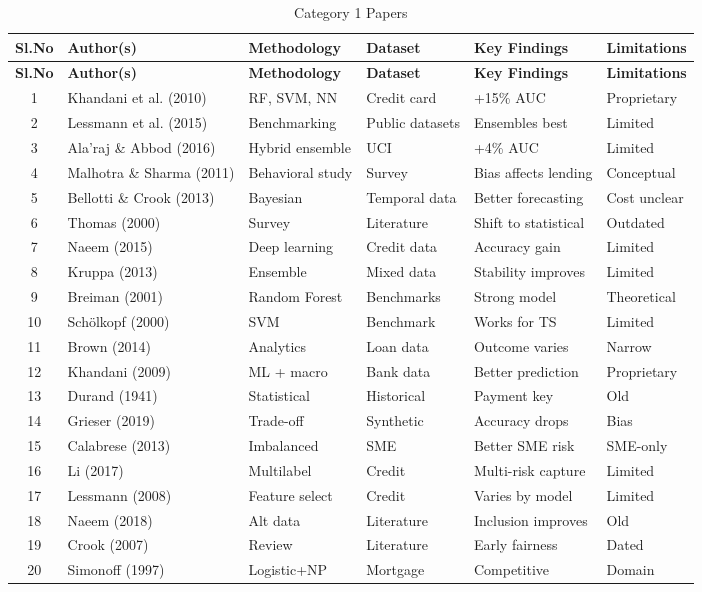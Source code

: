 \begin{longtable}{c p{} p{} p{} p{} p{}}
\caption{Category 1 Papers} \\
\toprule
\textbf{Sl.No} & \textbf{Author(s)} & \textbf{Methodology} & \textbf{Dataset} & \textbf{Key Findings} & \textbf{Limitations} \\
\midrule
\endfirsthead
\toprule
\textbf{Sl.No} & \textbf{Author(s)} & \textbf{Methodology} & \textbf{Dataset} & \textbf{Key Findings} & \textbf{Limitations} \\
\midrule
\endhead

1 & Khandani et al. (2010) & RF, SVM, NN & Credit card & +15\% AUC & Proprietary \\
2 & Lessmann et al. (2015) & Benchmarking & Public datasets & Ensembles best & Limited \\
3 & Ala'raj \& Abbod (2016) & Hybrid ensemble & UCI & +4\% AUC & Limited \\
4 & Malhotra \& Sharma (2011) & Behavioral study & Survey & Bias affects lending & Conceptual \\
5 & Bellotti \& Crook (2013) & Bayesian & Temporal data & Better forecasting & Cost unclear \\
6 & Thomas (2000) & Survey & Literature & Shift to statistical & Outdated \\
7 & Naeem (2015) & Deep learning & Credit data & Accuracy gain & Limited \\
8 & Kruppa (2013) & Ensemble & Mixed data & Stability improves & Limited \\
9 & Breiman (2001) & Random Forest & Benchmarks & Strong model & Theoretical \\
10 & Schölkopf (2000) & SVM & Benchmark & Works for TS & Limited \\
11 & Brown (2014) & Analytics & Loan data & Outcome varies & Narrow \\
12 & Khandani (2009) & ML + macro & Bank data & Better prediction & Proprietary \\
13 & Durand (1941) & Statistical & Historical & Payment key & Old \\
14 & Grieser (2019) & Trade-off & Synthetic & Accuracy drops & Bias \\
15 & Calabrese (2013) & Imbalanced & SME & Better SME risk & SME-only \\
16 & Li (2017) & Multilabel & Credit & Multi-risk capture & Limited \\
17 & Lessmann (2008) & Feature select & Credit & Varies by model & Limited \\
18 & Naeem (2018) & Alt data & Literature & Inclusion improves & Old \\
19 & Crook (2007) & Review & Literature & Early fairness & Dated \\
20 & Simonoff (1997) & Logistic+NP & Mortgage & Competitive & Domain \\
\bottomrule
\end{longtable}

